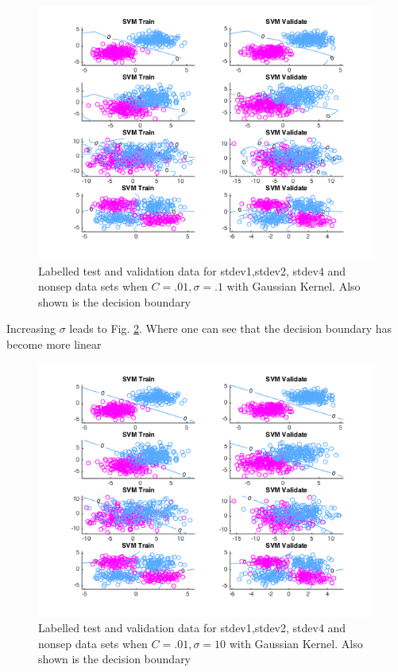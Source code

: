 \documentclass[10pt,twocolumn]{article}
\begin{document}
 \begin{figure}[H]
\center
\includegraphics[scale =.4]{Cpt01BWpt1.png}
\caption{Labelled test and validation data for stdev1,stdev2, stdev4 and nonsep data sets when $C=.01, \sigma =.1$ with Gaussian Kernel. Also shown is the decision boundary }
\label{SVM Gauss C01}
\end{figure}
 
 Increasing $\sigma$ leads to Fig. \ref{SVM Gauss C10}. Where one can see that the decision boundary has become more linear
 \begin{figure}[H]
\center
\includegraphics[scale =.4]{Cpt01BW10.png}
\caption{Labelled test and validation data for stdev1,stdev2, stdev4 and nonsep data sets when $C=.01, \sigma =10$ with Gaussian Kernel. Also shown is the decision boundary }
\label{SVM Gauss C10}
\end{figure}
\end{document}
